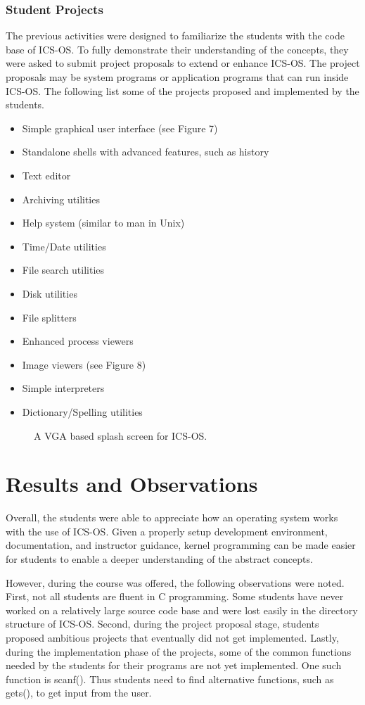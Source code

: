 \documentclass{acm_proc_article-sp}
\begin{document}
\subsubsection{Student Projects}
The previous activities were designed to familiarize the students with
the code base of ICS-OS. To fully demonstrate their understanding of the 
concepts, they were asked to submit project proposals to extend or enhance
ICS-OS. The project proposals may be system programs or application programs
that can run inside ICS-OS. The following list some of the projects proposed
and implemented by the students.

\begin{itemize}
\item{Simple graphical user interface (see Figure 7)}
\item{Standalone shells with advanced features, such as history}
\item{Text editor}
\item{Archiving utilities}
\item{Help system (similar to man in Unix)}
\item{Time/Date utilities}
\item{File search utilities}
\item{Disk utilities}
\item{File splitters}
\item{Enhanced process viewers}
\item{Image viewers (see Figure 8)}
\item{Simple interpreters}
\item{Dictionary/Spelling utilities}
\end{itemize}

\begin{figure}
\centering
{}
\caption{A VGA based splash screen for ICS-OS.}
\end{figure}



\section{Results and Observations}
Overall, the students were able to appreciate how an operating system works
with the use of ICS-OS. Given a properly setup development environment, 
documentation, and instructor guidance, kernel programming can be made easier
for students to enable a deeper understanding of the abstract concepts. 

However, during the course was offered, the following observations were noted.
First, not all students are fluent in C programming. Some students have never
worked on a relatively large source code base and were lost easily in the 
directory structure of ICS-OS. Second, during the project proposal stage,
students proposed ambitious projects that eventually did not get implemented.
Lastly, during the implementation phase of the projects, some of the 
common functions needed by the students for their programs are not yet
implemented. One such function is scanf(). Thus students need to find
alternative functions, such as gets(), to get input from the user.
\end{document}
